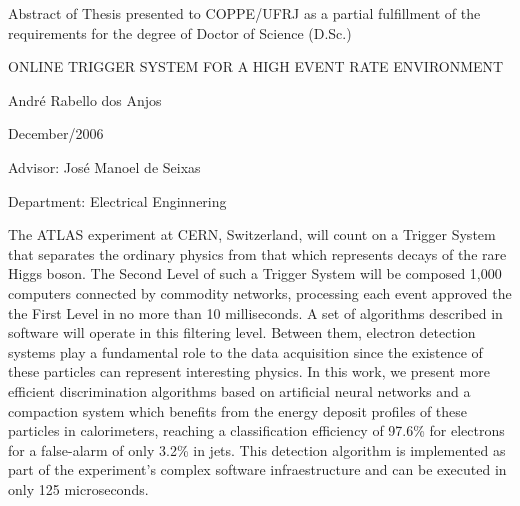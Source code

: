 \clearpage

\noindent
Abstract of Thesis presented to COPPE/UFRJ as a partial fulfillment of the
\linebreak requirements for the degree of Doctor of Science (D.Sc.)

\vspace{1.5cm}

\begin{center}
ONLINE TRIGGER SYSTEM FOR A HIGH EVENT RATE ENVIRONMENT 
\vspace{1cm}

André Rabello dos Anjos
\vspace{1cm}

December/2006
\end{center}
\vspace{2cm}

\noindent
Advisor: José Manoel de Seixas
\vspace{2cm}

\noindent
Department: Electrical Enginnering
\vspace{2cm}

\noindent \begin{summary}{1.2}
\hspace{0.8cm}The ATLAS experiment at CERN, Switzerland, will count on a
Trigger System that separates the ordinary physics from that which represents
decays of the rare Higgs boson. The Second Level of such a Trigger System will
be composed 1,000 computers connected by commodity networks, processing each
event approved the the First Level in no more than 10 milliseconds. A set of
algorithms described in software will operate in this filtering level. Between
them, electron detection systems play a fundamental role to the data
acquisition since the existence of these particles can represent interesting
physics. In this work, we present more efficient discrimination algorithms
based on artificial neural networks and a compaction system which benefits
from the energy deposit profiles of these particles in calorimeters, reaching
a classification efficiency of 97.6\% for electrons for a false-alarm of only
3.2\% in jets. This detection algorithm is implemented as part of the
experiment's complex software infraestructure and can be executed in only 125
microseconds.
\end{summary}
